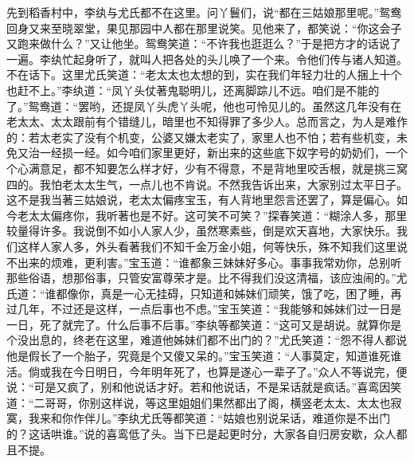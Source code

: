 \begin{parag}
    先到稻香村中，李纨与尤氏都不在这里。问丫鬟们，说“都在三姑娘那里呢。”鸳鸯回身又来至晓翠堂，果见那园中人都在那里说笑。见他来了，都笑说：“你这会子又跑来做什么？”又让他坐。鸳鸯笑道：“不许我也逛逛么？”于是把方才的话说了一遍。李纨忙起身听了，就叫人把各处的头儿唤了一个来。令他们传与诸人知道。不在话下。这里尤氏笑道：“老太太也太想的到，实在我们年轻力壮的人捆上十个也赶不上。”李纨道：“凤丫头仗著鬼聪明儿，还离脚踪儿不远。咱们是不能的了。”鸳鸯道：“罢哟，还提凤丫头虎丫头呢，他也可怜见儿的。虽然这几年没有在老太太、太太跟前有个错缝儿，暗里也不知得罪了多少人。总而言之，为人是难作的：若太老实了没有个机变，公婆又嫌太老实了，家里人也不怕；若有些机变，未免又治一经损一经。如今咱们家里更好，新出来的这些底下奴字号的奶奶们，一个个心满意足，都不知要怎么样才好，少有不得意，不是背地里咬舌根，就是挑三窝四的。我怕老太太生气，一点儿也不肯说。不然我告诉出来，大家别过太平日子。这不是我当著三姑娘说，老太太偏疼宝玉，有人背地里怨言还罢了，算是偏心。如今老太太偏疼你，我听著也是不好。这可笑不可笑？”探春笑道：“糊涂人多，那里较量得许多。我说倒不如小人家人少，虽然寒素些，倒是欢天喜地，大家快乐。我们这样人家人多，外头看著我们不知千金万金小姐，何等快乐，殊不知我们这里说不出来的烦难，更利害。”宝玉道：“谁都象三妹妹好多心。事事我常劝你，总别听那些俗语，想那俗事，只管安富尊荣才是。比不得我们没这清福，该应浊闹的。”尤氏道：“谁都像你，真是一心无挂碍，只知道和姊妹们顽笑，饿了吃，困了睡，再过几年，不过还是这样，一点后事也不虑。”宝玉笑道：“我能够和姊妹们过一日是一日，死了就完了。什么后事不后事。”李纨等都笑道：“这可又是胡说。就算你是个没出息的，终老在这里，难道他姊妹们都不出门的？”尤氏笑道：“怨不得人都说他是假长了一个胎子，究竟是个又傻又呆的。”宝玉笑道：“人事莫定，知道谁死谁活。倘或我在今日明日，今年明年死了，也算是遂心一辈子了。”众人不等说完，便说：“可是又疯了，别和他说话才好。若和他说话，不是呆话就是疯话。”喜鸾因笑道：“二哥哥，你别这样说，等这里姐姐们果然都出了阁，横竖老太太、太太也寂寞，我来和你作伴儿。”李纨尤氏等都笑道：“姑娘也别说呆话，难道你是不出门的？这话哄谁。”说的喜鸾低了头。当下已是起更时分，大家各自归房安歇，众人都且不提。
\end{parag}


